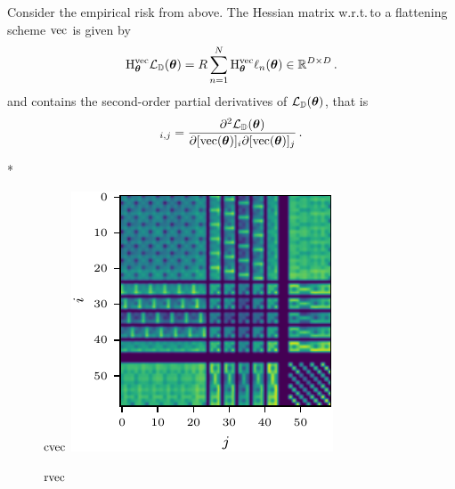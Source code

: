 Consider the empirical risk from above. The Hessian matrix w.r.t.\,to a flattening scheme $\vec$ is given by
\begin{align*}
  \hess_{\vtheta}^{\vec} \gL_{\sD}(\vtheta)
  =
  R
  \sum_{n=1}^N
  \hess_{\vtheta}^{\vec} \ell_n(\vtheta) \in \sR^{D \times D}\,.
\end{align*}
and contains the second-order partial derivatives of $\gL_{\sD}(\vtheta)$, that is
\begin{align*}
  [\hess_{\vtheta}^{\vec} \gL_{\sD}(\vtheta)]_{i,j}
  =
  \frac{\partial^2 \gL_{\sD}(\vtheta)}{\partial [\vec(\vtheta)]_i \partial [\vec(\vtheta)]_j}\,.
\end{align*}

\switchcolumn[1]*
\begin{figure}
  \centering
  \begin{minipage}[t]{0.495\linewidth}
    \centering
    $\cvec$\vspace{1ex}
    \includegraphics[width=\linewidth]{../kfs/plots/synthetic_cvec_hessian.pdf}
  \end{minipage}
  \hfill
  \begin{minipage}[t]{0.495\linewidth}
    \centering
    $\rvec$\vspace{1ex}

\end{minipage}
\end{figure}
